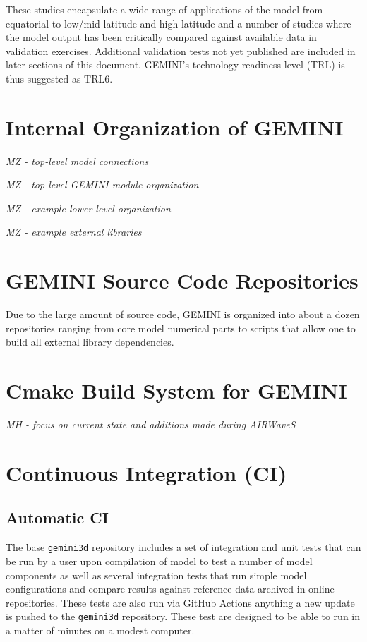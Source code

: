 \documentclass[11pt,letterpaper]{article}
\begin{document}
These studies encapsulate a wide range of applications of the model from equatorial to low/mid-latitude and high-latitude and a number of studies where the model output has been critically compared against available data in validation exercises.  Additional validation tests not yet published are included in later sections of this document.  GEMINI's technology readiness level (TRL) is thus suggested as TRL6.  

\section{Internal Organization of GEMINI}

\emph{MZ - top-level model connections}

\emph{MZ - top level GEMINI module organization}

\emph{MZ - example lower-level organization}

\emph{MZ - example external libraries}



\section{GEMINI Source Code Repositories}

Due to the large amount of source code, GEMINI is organized into about a dozen repositories ranging from core model numerical parts to scripts that allow one to build all external library dependencies.  


\section{Cmake Build System for GEMINI}

\emph{MH - focus on current state and additions made during AIRWaveS}



\section{Continuous Integration (CI)}

\subsection{Automatic CI}

The base \texttt{gemini3d} repository includes a set of integration and unit tests that can be run by a user upon compilation of model to test a number of model components as well as several integration tests that run simple model configurations and compare results against reference data archived in online repositories.  These tests are also run via GitHub Actions anything a new update is pushed to the \texttt{gemini3d} repository.  These test are designed to be able to run in a matter of minutes on a modest computer.  
\end{document}
